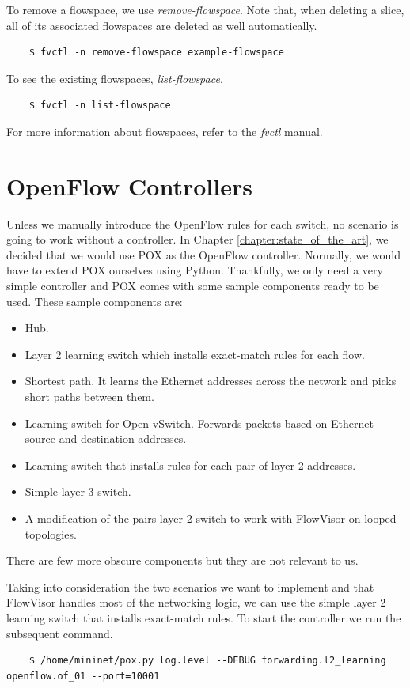 To remove a flowspace, we use \textit{remove-flowspace}. Note that, when deleting a slice, all of its associated flowspaces are deleted as well automatically.
\begin{lstlisting}
    $ fvctl -n remove-flowspace example-flowspace
\end{lstlisting}

To see the existing flowspaces, \textit{list-flowspace}.
\begin{lstlisting}
    $ fvctl -n list-flowspace
\end{lstlisting}

For more information about flowspaces, refer to the \textit{fvctl} manual.

\section{OpenFlow Controllers}
Unless we manually introduce the OpenFlow rules for each switch, no scenario is going to work without a controller. In Chapter \ref{chapter:state_of_the_art}, we decided that we would use POX as the OpenFlow controller. Normally, we would have to extend POX ourselves using Python. Thankfully, we only need a very simple controller and POX comes with some sample components ready to be used. These sample components are:
\begin{itemize}
    \item Hub.
    \item Layer 2 learning switch which installs exact-match rules for each flow.
    \item Shortest path. It learns the Ethernet addresses across the network and picks short paths between them.
    \item Learning switch for Open vSwitch. Forwards packets based on Ethernet source and destination addresses.
    \item Learning switch that installs rules for each pair of layer 2 addresses.
    \item Simple layer 3 switch.
    \item A modification of the pairs layer 2 switch to work with FlowVisor on looped topologies.  
\end{itemize}

There are few more obscure components but they are not relevant to us.

Taking into consideration the two scenarios we want to implement and that FlowVisor handles most of the networking logic, we can use the simple layer 2 learning switch that installs exact-match rules. To start the controller we run the subsequent command.
\begin{lstlisting}
    $ /home/mininet/pox.py log.level --DEBUG forwarding.l2_learning openflow.of_01 --port=10001
\end{lstlisting}

